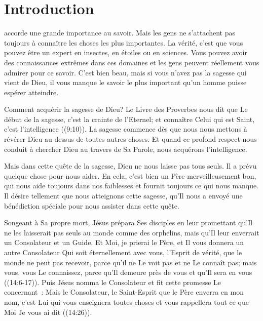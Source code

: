 
\chapter{Introduction}


 accorde une grande
 importance au savoir. Mais les gens ne s'attachent pas toujours
 à connaître les choses les plus importantes.
 La vérité, c'est que vous pouvez être un expert en insectes,
 en étoiles ou en sciences. Vous pouvez avoir des connaissances extrêmes
 dans ces domaines et les gens peuvent réellement vous admirer pour ce savoir.
 C'est bien beau, mais si vous n'avez pas la sagesse qui vient de Dieu,
 il vous manque le savoir le plus important qu'un homme puisse espérer atteindre.

Comment acquérir la sagesse de Dieu? Le Livre des Proverbes nous dit que
 \og Le début de la sagesse, c'est la crainte de l'Eternel;
 et connaître Celui qui est Saint, c'est l'intelligence \fg{}
 ((9:10)).
 La sagesse commence dès que nous nous mettons à révérer Dieu au-dessus
 de toutes autres choses. Et quand ce profond respect nous conduit
 à chercher Dieu au travers de Sa Parole, nous acquérons l'intelligence.

Mais dans cette quête de la sagesse, Dieu ne nous laisse pas tous seuls.
 Il a prévu quelque chose pour nous aider. En cela, c'est bien un Père
 merveilleusement bon, qui nous aide toujours dans nos faiblesses et fournit
 toujours ce qui nous manque. Il désire tellement que nous atteignons cette
 sagesse, qu'Il nous a envoyé une bénédiction spéciale pour nous assister
 dans cette quête. 

Songeant à Sa propre mort, Jésus prépara Ses disciples en leur promettant
 qu'Il ne les laisserait pas seuls au monde comme des orphelins,
 mais qu'Il leur enverrait un Consolateur et un Guide.
 \og Et Moi, je prierai le Père, et Il vous donnera un autre Consolateur
 Qui soit éternellement avec vous, l'Esprit de vérité, que le monde
 ne peut pas recevoir, parce qu'il ne Le voit pas et ne Le connaît pas;
 mais vous, vous Le connaissez, parce qu'Il demeure près de vous
 et qu'Il sera en vous \fg{} ((14:6-17)).
 Puis Jésus nomma le Consolateur et fit cette promesse Le concernant~:
 \og Mais le Consolateur, le Saint-Esprit que le Père enverra en mon nom,
 c'est Lui qui vous enseignera toutes choses et vous rappellera tout ce que
 Moi Je vous ai dit \fg{} ((14:26)).

